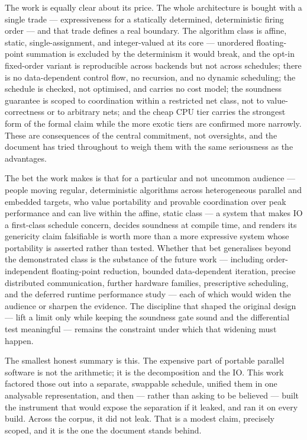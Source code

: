 The work is equally clear about its price. The whole architecture is bought with a
single trade --- expressiveness for a statically determined, deterministic firing
order --- and that trade defines a real boundary. The algorithm class is affine,
static, single-assignment, and integer-valued at its core --- unordered
floating-point summation is excluded by the determinism it would break, and the
opt-in fixed-order variant is reproducible across backends but not across
schedules; there is no data-dependent control flow,
no recursion, and no dynamic scheduling; the schedule is checked, not optimised, and
carries no cost model; the soundness guarantee is scoped to coordination within a
restricted net class, not to value-correctness or to arbitrary nets; and the cheap
CPU tier carries the strongest form of the formal claim while the more exotic tiers
are confirmed more narrowly. These are consequences of the central commitment, not
oversights, and the document has tried throughout to weigh them with the same
seriousness as the advantages.

The bet the work makes is that for a particular and not uncommon audience --- people
moving regular, deterministic algorithms across heterogeneous parallel and embedded
targets, who value portability and provable coordination over peak performance and
can live within the affine, static class --- a system that makes IO a first-class
schedule concern, decides soundness at compile time, and renders its genericity
claim falsifiable is worth more than a more expressive system whose portability is
asserted rather than tested. Whether that bet generalises beyond the demonstrated
class is the substance of the future work --- including order-independent
floating-point reduction, bounded data-dependent iteration, precise distributed
communication, further hardware families, prescriptive scheduling, and the deferred
runtime performance study --- each of which would widen the audience or sharpen the
evidence. The discipline that
shaped the original design --- lift a limit only while keeping the soundness gate
sound and the differential test meaningful --- remains the constraint under which
that widening must happen.

The smallest honest summary is this. The expensive part of portable parallel
software is not the arithmetic; it is the decomposition and the IO. This work
factored those out into a separate, swappable schedule, unified them in one analysable
representation, and then --- rather than asking to be believed --- built the
instrument that would expose the separation if it leaked, and ran it on every build.
Across the corpus, it did not leak. That is a modest claim, precisely scoped, and it
is the one the document stands behind.
